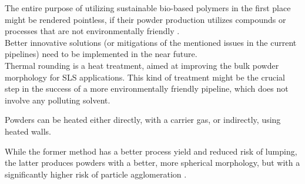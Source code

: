 \documentclass[a4paper]{article}
\begin{document}
    The entire purpose of utilizing sustainable bio-based polymers in the first place might be rendered pointless, if their powder production 
    utilizes compounds or processes that are not environmentally friendly \autocites{Solutions_plastic_pollution}. \\ 

    Better innovative solutions (or mitigations of the mentioned issues in the current pipelines) need to be implemented in the near future. \\ 

    Thermal rounding is a heat treatment, aimed at improving the bulk powder morphology for SLS applications. 
    This kind of treatment might be the crucial step in the success of a more environmentally friendly pipeline, which does not involve 
    any polluting solvent.

    Powders can be heated either directly, with a carrier gas, or indirectly, using heated walls. 

    While the former method has a better process yield and reduced risk of lumping, the latter produces powders with 
    a better, more spherical morphology, but with a significantly higher risk of particle agglomeration \autocite{Dechet_Schmidt_thermal_rounding}.

    \clearpage
\end{document}
